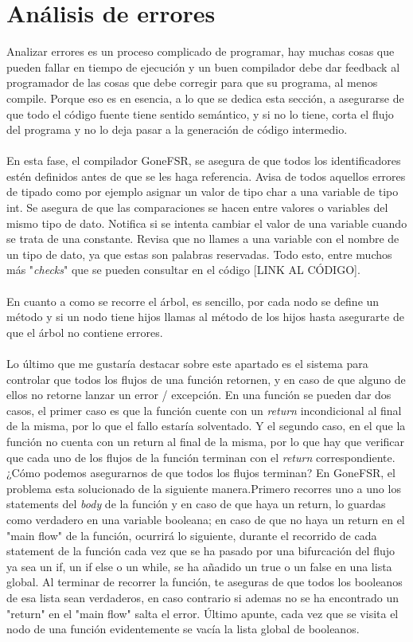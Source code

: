 \section{Análisis de errores}
Analizar errores es un proceso complicado de programar, hay muchas cosas que pueden fallar en tiempo de ejecución y un buen compilador debe dar feedback al programador de las cosas que debe corregir para que su programa, al menos compile. Porque eso es en esencia, a lo que se dedica esta sección, a asegurarse de que todo el código fuente tiene sentido semántico, y si no lo tiene, corta el flujo del programa y no lo deja pasar a la generación de código intermedio.  \\\\
En esta fase, el compilador GoneFSR, se asegura de que todos los identificadores estén definidos antes de que se les haga referencia. Avisa de todos aquellos errores de tipado como por ejemplo asignar un valor de tipo char a una variable de tipo int. Se asegura de que las comparaciones se hacen entre valores o variables del mismo tipo de dato. Notifica si se intenta cambiar el valor de una variable cuando se trata de una constante. Revisa que no llames a una variable con el nombre de un tipo de dato, ya que estas son palabras reservadas. Todo esto, entre muchos más "\textit{checks}" que se pueden consultar en el código [LINK AL CÓDIGO].
\\\\
En cuanto a como se recorre el árbol, es sencillo, por cada nodo se define un método y si un nodo tiene hijos llamas al método de los hijos hasta asegurarte de que el árbol no contiene errores.\\\\
Lo último que me gustaría destacar sobre este apartado es el sistema para controlar que todos los flujos de una función retornen, y en caso de que alguno de ellos no retorne lanzar un error / excepción. En una función se pueden dar dos casos, el primer caso es que la función cuente con un \textit{return} incondicional al final de la misma, por lo que el fallo estaría solventado. Y el segundo caso, en el que la función no cuenta con un return al final de la misma, por lo que hay que verificar que cada uno de los flujos de la función terminan con el \textit{return} correspondiente. ¿Cómo podemos asegurarnos de que todos los flujos terminan? En GoneFSR, el problema esta solucionado de la siguiente manera.Primero recorres uno a uno los statements del \textit{body} de la función y en caso de que haya un return, lo guardas como verdadero en una variable booleana; en caso de que no haya un return en el "main flow" de la función, ocurrirá lo siguiente, durante el recorrido de cada statement de la función cada vez que se ha pasado por una bifurcación del flujo ya sea un if, un if else o un while, se ha añadido un true o un false en una lista global. Al terminar de recorrer la función, te aseguras de que todos los booleanos de esa lista sean verdaderos, en caso contrario si ademas no se ha encontrado un "return" en el "main flow" salta el error. Último apunte, cada vez que se visita el nodo de una función evidentemente se vacía la lista global de booleanos.
